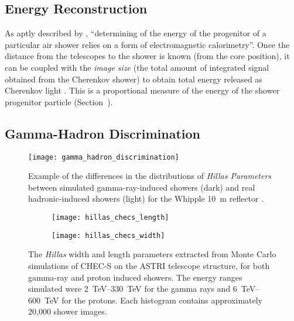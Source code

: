\subsection{Energy Reconstruction}

As aptly described by \textcite[][p.~16]{Dickinson2010}, ``determining of the energy of the progenitor of a particular air shower relies on a form of electromagnetic calorimetry''. Once the distance from the telescopes to the shower is known (from the core position), it can be coupled with the \textit{image size} (the total amount of integrated signal obtained from the Cherenkov shower) to obtain total energy released as Cherenkov light \cite{Cogan2006,Bernlohr2013a}. This is a proportional measure of the energy of the shower progenitor particle (Section~).

\subsection{Gamma-Hadron Discrimination}

\begin{figure}
	\centering
    \texttt{[image: gamma\_hadron\_discrimination]} 
	\caption[Discriminating between images of gamma-ray and hadron induced showers.]{Example of the differences in the distributions of \textit{Hillas Parameters} between simulated gamma-ray-induced showers (dark) and real hadronic-induced showers (light) for the Whipple \SI{10}{m} reflector \cite{Fegan1999a}.}
	\label{fig:gamma_hadron_discrimination}
\end{figure}

\begin{figure}
  \begin{subfigure}[b]{0.49\textwidth}
    \texttt{[image: hillas\_checs\_length]}
    \caption{}
    \label{fig:hillas_checs_length}
  \end{subfigure}
  \hfill
  \begin{subfigure}[b]{0.49\textwidth}
    \texttt{[image: hillas\_checs\_width]}
    \caption{}
    \label{fig:hillas_checs_width}
  \end{subfigure}
  \caption[Hillas width and length from CHEC-S simulations.]{The \textit{Hillas} width and length parameters extracted from Monte Carlo simulations of CHEC-S on the ASTRI telescope structure, for both gamma-ray and proton induced showers. The energy ranges simulated were \SIrange{2}{330}{TeV} for the gamma rays and \SIrange{6}{600}{TeV} for the protons. Each histogram contains approximately 20,000 shower images.}
    \label{fig:hillas_checs}
\end{figure}

